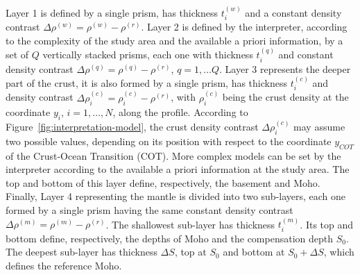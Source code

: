 \documentclass[manuscript,revised]{geophysics}
\begin{document}
Layer 1 is defined by a single prism, has thickness $t^{(w)}_{i}$ and a constant density
contrast $\Delta \rho^{(w)} = \rho^{(w)} - \rho^{(r)}$.
Layer 2 is defined by the interpreter, according to the complexity of the study area 
and the available a priori information, by a set of $Q$ vertically stacked
prisms, each one with thickness $t^{(q)}_{i}$ and constant density contrast
$\Delta \rho^{(q)} = \rho^{(q)} - \rho^{(r)}$, $q = 1, \dots Q$.
Layer 3 represents the deeper part of the crust, it is also formed by a single prism,
has thickness $t^{(c)}_{i}$ and density contrast 
$\Delta \rho^{(c)}_{i} = \rho^{(c)}_{i} - \rho^{(r)}$, 
with $\rho^{(c)}_{i}$ being the crust density at the coordinate
$y_{i}$, $i = 1, \dots, N$, along the profile.
According to Figure~\ref{fig:interpretation-model}, the crust density contrast
$\Delta \rho^{(c)}_{i}$ may assume two possible values, depending on its position
with respect to the coordinate $y_{COT}$ of the Crust-Ocean Transition (COT).
More complex models can be set by the interpreter according to the available
a priori information at the study area.
The top and bottom of this layer define, respectively, the basement and Moho. 
Finally, Layer 4 representing the mantle is divided into two sub-layers, each one formed
by a single prism having the same constant density contrast 
$\Delta \rho^{(m)} = \rho^{(m)} - \rho^{(r)}$. The shallowest sub-layer 
has thickness $t^{(m)}_{i}$. Its top and bottom define,
respectively, the depths of Moho and the compensation depth $S_{0}$.
The deepest sub-layer has thickness $\Delta S$, top at $S_{0}$ and bottom at 
$S_{0} + \Delta S$, which defines the reference Moho. 
\end{document}

